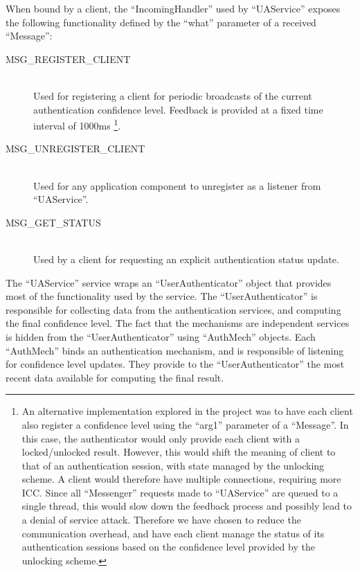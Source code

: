 When bound by a client, the ``IncomingHandler'' used by ``UAService''  exposes the following functionality defined by the ``what'' parameter of a received ``Message'': 
\begin{description}
  \item[MSG\_REGISTER\_CLIENT] \hfill \\
  Used for registering a client for periodic broadcasts of the current authentication confidence level. Feedback is provided at a fixed time interval of 1000ms \footnote{An alternative implementation explored in the project was to have each client also register a confidence level using the ``arg1'' parameter of a ``Message''. In this case, the authenticator would only provide each client with a locked/unlocked result. However, this would shift the meaning of client to that of an authentication session, with state managed by the unlocking scheme. A client would therefore have multiple connections, requiring more ICC. Since all ``Messenger'' requests made to ``UAService'' are queued to a single thread, this would slow down the feedback process and possibly lead to a denial of service attack. Therefore we have chosen to reduce the communication overhead, and have each client manage the status of its authentication sessions based on the confidence level provided by the unlocking scheme.}.

  \item[MSG\_UNREGISTER\_CLIENT] \hfill \\
  Used for any application component to unregister as a listener from ``UAService''.
  
  \item[MSG\_GET\_STATUS] \hfill \\
  Used by a client for requesting an explicit authentication status update.
  
\end{description}

The ``UAService'' service wraps an ``UserAuthenticator'' object that provides most of the functionality used by the service. The ``UserAuthenticator'' is responsible for collecting data from the authentication services, and computing the final confidence level. The fact that the mechanisms are independent services is hidden from the ``UserAuthenticator'' using ``AuthMech'' objects. Each ``AuthMech'' binds an authentication mechanism, and is responsible of listening for confidence level updates. They provide to the ``UserAuthenticator'' the most recent data available for computing the final result.

